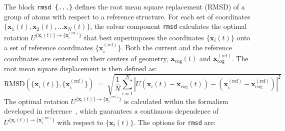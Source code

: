The block \texttt{rmsd~\{...\}} defines the root mean square replacement
(RMSD) of a group of atoms with respect to a reference structure.  For
each set of coordinates $\{ \mathbf{x}_1(t), \mathbf{x}_2(t), \ldots
\mathbf{x}_N(t) \}$, the colvar component \texttt{rmsd} calculates the
optimal rotation
$U^{\{\mathbf{x}_{i}(t)\}\rightarrow\{\mathbf{x}_{i}^{\mathrm{(ref)}}\}}$
that best superimposes the coordinates $\{\mathbf{x}_{i}(t)\}$ onto a
set of reference coordinates $\{\mathbf{x}_{i}^{\mathrm{(ref)}}\}$.
Both the current and the reference coordinates are centered on their
centers of geometry, $\mathbf{x}_{\mathrm{cog}}(t)$ and
$\mathbf{x}_{\mathrm{cog}}^{\mathrm{(ref)}}$.  The root mean square
displacement is then defined as:
\begin{equation}
  \label{eq:cvc_rmsd}
  { \mathrm{RMSD}(\{\mathbf{x}_{i}(t)\},
    \{\mathbf{x}_{i}^{\mathrm{(ref)}}\}) } \; = \; \sqrt{
    \frac{1}{N} \sum_{i=1}^{N} \left|
      U
      \left(\mathbf{x}_{i}(t) - \mathbf{x}_{\mathrm{cog}}(t)\right) -
      \left(\mathbf{x}_{i}^{\mathrm{(ref)}} -
        \mathbf{x}_{\mathrm{cog}}^{\mathrm{(ref)}} \right) \right|^{2} }
\end{equation}
The optimal rotation
$U^{\{\mathbf{x}_{i}(t)\}\rightarrow\{\mathbf{x}_{i}^{\mathrm{(ref)}}\}}$
is calculated within the formalism developed in
reference~\cite{Coutsias2004}, which guarantees a continuous
dependence of
$U^{\{\mathbf{x}_{i}(t)\}\rightarrow\{\mathbf{x}_{i}^{\mathrm{(ref)}}\}}$
with respect to $\{\mathbf{x}_{i}(t)\}$.  The options for \texttt{rmsd}
are:
